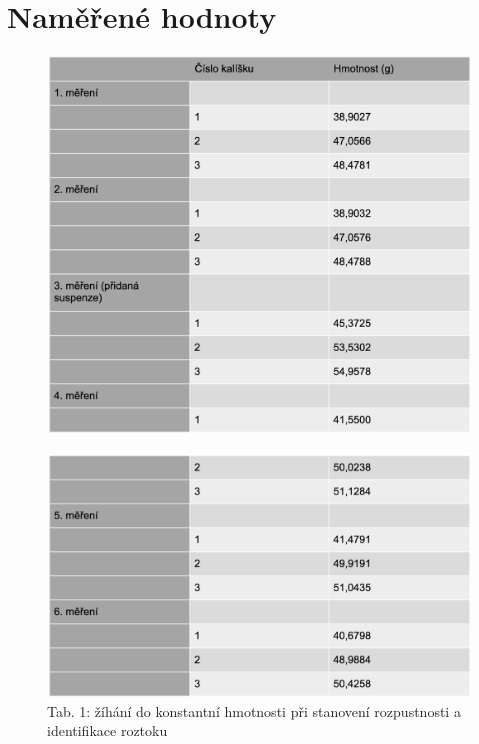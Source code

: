 \documentclass[13pt, a4paper, twoside]{article}
\begin{document}
\section*{Naměřené hodnoty}
\begin{figure}[H]
    \centering
    \includegraphics[width=6.8in]{tab_uloha10_1.png}
\end{figure}

\begin{figure}[H]
    \centering
    \includegraphics[width=6.8in]{tab_uloha10_2.png}
    \caption*{Tab. 1: žíhání do konstantní hmotnosti při stanovení rozpustnosti a identifikace roztoku
    }
\end{figure}
\end{document}
